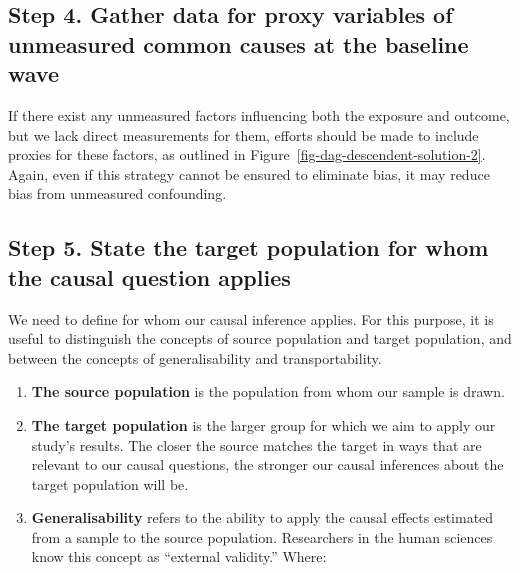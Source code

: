 \documentclass[
  singlecolumn]{report}
\begin{document}
\hypertarget{step-4.-gather-data-for-proxy-variables-of-unmeasured-common-causes-at-the-baseline-wave}{%
\subsection{Step 4. Gather data for proxy variables of unmeasured common
causes at the baseline
wave}\label{step-4.-gather-data-for-proxy-variables-of-unmeasured-common-causes-at-the-baseline-wave}}

If there exist any unmeasured factors influencing both the exposure and
outcome, but we lack direct measurements for them, efforts should be
made to include proxies for these factors, as outlined in
Figure~\ref{fig-dag-descendent-solution-2}. Again, even if this strategy
cannot be ensured to eliminate bias, it may reduce bias from unmeasured
confounding.

\hypertarget{step-5.-state-the-target-population-for-whom-the-causal-question-applies}{%
\subsection{Step 5. State the target population for whom the causal
question
applies}\label{step-5.-state-the-target-population-for-whom-the-causal-question-applies}}

We need to define for whom our causal inference applies. For this
purpose, it is useful to distinguish the concepts of source population
and target population, and between the concepts of generalisability and
transportability.

\begin{enumerate}
\def\labelenumi{\arabic{enumi}.}
\item
  \textbf{The source population} is the population from whom our sample
  is drawn.
\item
  \textbf{The target population} is the larger group for which we aim to
  apply our study's results. The closer the source matches the target in
  ways that are relevant to our causal questions, the stronger our
  causal inferences about the target population will be.
\item
  \textbf{Generalisability} refers to the ability to apply the causal
  effects estimated from a sample to the source population. Researchers
  in the human sciences know this concept as ``external validity.''
  Where:
\end{enumerate}
\end{document}
